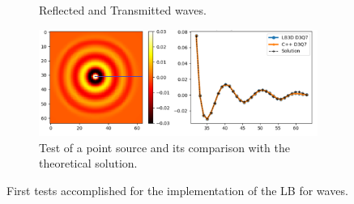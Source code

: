 \begin{figure}
\begin{subfigure}{0.34\textwidth}
    \caption{Reflected and Transmitted waves.}
    \label{fig:interphase_final}
    \end{subfigure}
    \begin{subfigure}{0.7\textwidth}
    \centering
    \includegraphics[width=\textwidth]{images/Results/PointSourceAlone.png}
    \caption{Test of a point source and its comparison with the theoretical solution.}
    \label{fig:point_source}
    \end{subfigure}
    \caption{First tests accomplished for the implementation of the LB for waves.}
    \label{fig:interphase}
\end{figure}
